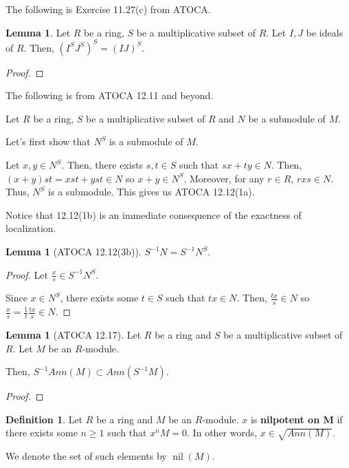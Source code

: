 \documentclass{article}
\theoremstyle{definition}
\newtheorem{definition}{Definition}
\newtheorem{lemma}[theorem]{Lemma}
\newcommand{\nil}{\operatorname{nil}}
\begin{document}
The following is Exercise 11.27(c) from ATOCA.

\begin{lemma}
    Let $ R $ be a ring, $ S $ be a multiplicative subset of $ R $.
    Let $ I,J $ be ideals of $ R $.
    Then, $ (I^{S}J^{S})^{S} = (IJ)^{S} $.
\end{lemma}
\begin{proof}
    
\end{proof}

The following is from ATOCA 12.11 and beyond.

Let $ R $ be a ring, $ S $ be a multiplicative subset of $ R $ and $ N $ be a submodule
of $ M $.

Let's first show that $ N^{S} $ is a submodule of $ M $.

Let $ x,y \in N^{S} $. Then, there exists $ s,t \in S $ such
that $ sx + ty \in N $. Then, $ (x + y)st = xst + yst \in N $
so $ x + y \in N^{S} $. Moreover, for any $ r \in R $, $ rxs \in N $.
Thus, $ N^{S} $ is a submodule. This gives us ATOCA 12.12(1a).

Notice that 12.12(1b) is an immediate consequence of the exactness of localization.

\begin{lemma}[ATOCA 12.12(3b)]
    $ S^{-1} N = S^{-1} N^{S} $.
\end{lemma}
\begin{proof}
    Let $ \frac{x}{s} \in S^{-1} N^{S} $.

    Since $ x \in N^{S} $, there exists some $ t \in S $ such that $ tx \in N $.
    Then, $ \frac{tx}{s} \in N $ so $ \frac{x}{s} = \frac{1}{t} \frac{tx}{s} \in N $.
\end{proof}



\begin{lemma}[ATOCA 12.17]
    Let $ R $ be a ring and $ S $ be a multiplicative subset of $ R $.
    Let $ M $ be an $ R $-module.

    Then, $ S^{-1} Ann(M) \subset Ann(S^{-1} M) $.
\end{lemma}
\begin{proof}
    
\end{proof}

\begin{definition}
    Let $ R $ be a ring and $ M $ be an $ R $-module.
    $ x $ is \textbf{nilpotent on M} if there exists
    some $ n \geq 1 $ such that $ x^{n}M  = 0 $.
    In other words, $ x \in \sqrt{Ann(M)} $.

    We denote the set of such elements by $ \nil(M) $.
\end{definition}
\end{document}
